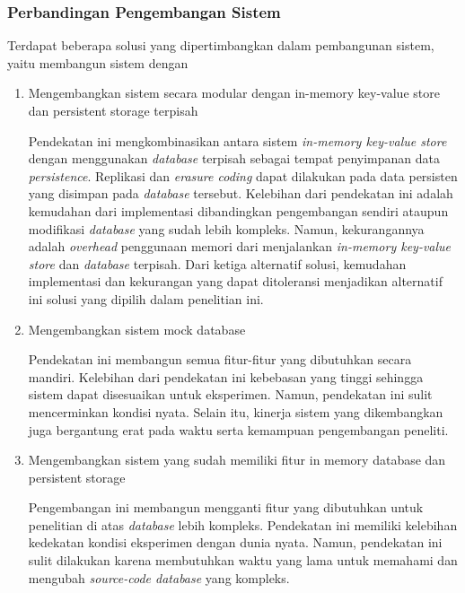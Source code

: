 \subsubsection{Perbandingan Pengembangan Sistem}
\label{subsubsection:perbandingan-pengembangan-sistem}

Terdapat beberapa solusi yang dipertimbangkan dalam pembangunan sistem, yaitu membangun sistem dengan 

\begin{enumerate}
  \item Mengembangkan sistem secara modular dengan in-memory key-value store dan persistent storage terpisah
  
  Pendekatan ini mengkombinasikan antara sistem \textit{in-memory key-value store} dengan menggunakan \textit{database} terpisah sebagai tempat penyimpanan data \textit{persistence}. Replikasi dan \textit{erasure coding} dapat dilakukan pada data persisten yang disimpan pada \textit{database} tersebut. Kelebihan dari pendekatan ini adalah kemudahan dari implementasi dibandingkan pengembangan sendiri ataupun modifikasi \textit{database} yang sudah lebih kompleks. Namun, kekurangannya adalah \textit{overhead} penggunaan memori dari menjalankan \textit{in-memory key-value store} dan \textit{database} terpisah. Dari ketiga alternatif solusi, kemudahan implementasi dan kekurangan yang dapat ditoleransi menjadikan alternatif ini solusi yang dipilih dalam penelitian ini.


  \item Mengembangkan sistem mock database
  
  Pendekatan ini membangun semua fitur-fitur yang dibutuhkan secara mandiri. Kelebihan dari pendekatan ini kebebasan yang tinggi sehingga sistem dapat disesuaikan untuk eksperimen. Namun, pendekatan ini sulit mencerminkan kondisi nyata. Selain itu, kinerja sistem yang dikembangkan juga bergantung erat pada waktu serta kemampuan pengembangan peneliti.

  \item Mengembangkan sistem yang sudah memiliki fitur in memory database dan persistent storage
  
  Pengembangan ini membangun mengganti fitur yang dibutuhkan untuk penelitian di atas \textit{database} lebih kompleks. Pendekatan ini memiliki kelebihan kedekatan kondisi eksperimen dengan dunia nyata. Namun, pendekatan ini sulit dilakukan karena membutuhkan waktu yang lama untuk memahami dan mengubah \textit{source-code database} yang kompleks.
\end{enumerate}